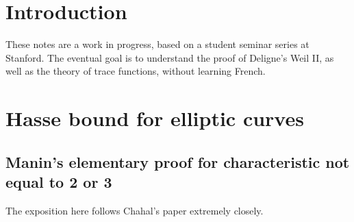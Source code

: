\documentclass[letterpaper,11pt]{article}
\begin{document}
\tableofcontents

\section{Introduction}

These notes are a work in progress, based on a student seminar series at Stanford. The eventual goal is to understand the proof of Deligne's Weil II, as well as the theory of trace functions, without learning French.

\section{Hasse bound for elliptic curves}

\subsection{Manin's elementary proof for characteristic not equal to 2 or 3}

The exposition here follows Chahal's paper \cite{chahal-manin} extremely closely.
\end{document}
